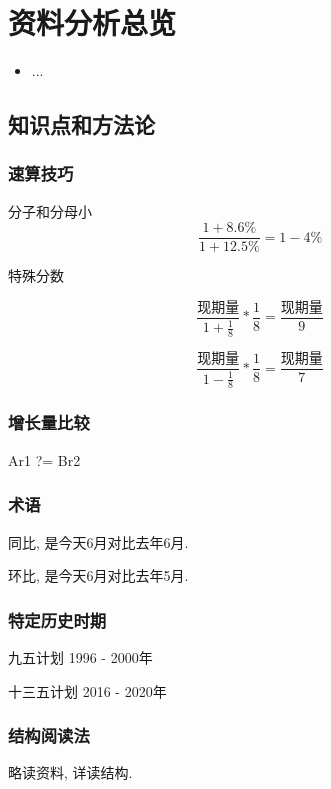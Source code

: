 \chapter{资料分析总览}
\label{chap1}
\begin{itemize}[noitemsep,topsep=0pt,parsep=0pt,partopsep=0pt]
	\item ...
\end{itemize}

\section{知识点和方法论}

\subsection{速算技巧}

分子和分母小
$$
	\frac{1+8.6\%}{1+12.5\%} = 1- 4\%
$$

特殊分数

$$
	\frac{\mbox{现期量}}{1+\frac{1}{8}} * \frac{1}{8} = \frac{\mbox{现期量}}{9}
$$

$$
	\frac{\mbox{现期量}}{1-\frac{1}{8}} * \frac{1}{8} = \frac{\mbox{现期量}}{7}
$$

\subsection{增长量比较}

Ar1 ?= Br2



\subsection{术语}
同比, 是今天6月对比去年6月.

环比, 是今天6月对比去年5月.

\subsection{特定历史时期}

九五计划 1996 - 2000年

十三五计划 2016 - 2020年

\subsection{结构阅读法}

略读资料, 详读结构.


